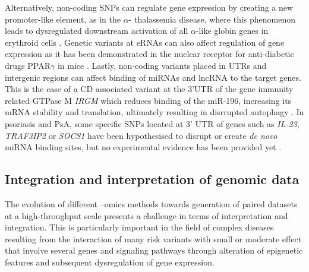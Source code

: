 Alternatively, non-coding SNPs can regulate gene expression by creating a new promoter-like element, as in the $\alpha$- thalassemia disease, where this phenomenon leads to dysregulated downstream activation of all $\alpha$-like globin genes in erythroid cells \parencite{Gobbi2006}. Genetic variants at eRNAs can also affect regulation of gene expression as it has been demonstrated in the nuclear receptor for anti-diabetic drugs PPAR$\gamma$ in mice \parencite{Soccio2015}. Lastly, non-coding variants placed in UTRs and intergenic regions can affect binding of miRNAs and lncRNA to the target genes. This is the case of a CD associated variant at the 3'UTR of the gene immunity related GTPase M \textit{IRGM} which reduces binding of the miR-196, increasing its mRNA stability and translation, ultimately resulting in disrrupted autophagy  \parencite{Brest2011}. In psoriasis and PsA, some specific SNPs located at 3' UTR of genes such as \textit{IL-23}, \textit{TRAF3IP2} or \textit{SOCS1} have been hypothesised to disrupt or create \textit{de novo} miRNA binding sites, but no experimental evidence has been provided yet \parencite{Pivarcsi2014}. 



\subsection{Integration and interpretation of genomic data}
The evolution of different –omics methods towards generation of paired datasets at a high-throughput scale presents a challenge in terms of interpretation and integration. This is particularly important in the field of complex diseases resulting from the interaction of many risk variants with small or moderate effect that involve several genes and signaling pathways through alteration of epigenetic features and subsequent dysregulation of gene expression.


